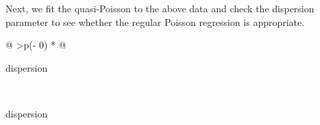 \documentclass[
]{book}
\newenvironment{Shaded}{\begin{snugshade}}{\end{snugshade}}
\newcommand{\AttributeTok}[1]{\textcolor[rgb]{0.13,0.29,0.53}{#1}}
\newcommand{\FunctionTok}[1]{\textcolor[rgb]{0.13,0.29,0.53}{\textbf{#1}}}
\newcommand{\NormalTok}[1]{#1}
\newcommand{\OtherTok}[1]{\textcolor[rgb]{0.56,0.35,0.01}{#1}}
\newcommand{\SpecialCharTok}[1]{\textcolor[rgb]{0.81,0.36,0.00}{\textbf{#1}}}
\newcommand{\StringTok}[1]{\textcolor[rgb]{0.31,0.60,0.02}{#1}}
\begin{document}
Next, we fit the quasi-Poisson to the above data and check the dispersion parameter to see whether the regular Poisson regression is appropriate.

\begin{Shaded}
\end{Shaded}

\begin{longtable}[]{@{}
  >{\centering\arraybackslash}p{(\columnwidth - 0\tabcolsep) * }@{}}
\caption{The dispersion paramter of the Poisson regression
The value of the dispersion is slightly bigger than 1 (if there is no dispersion, the dispersion parameter = 1). We only need to fit the Poisson regression to the data and use the fitted Poisson regression model to address the association between the concentration level and the survival rate.}\tabularnewline
\toprule\noalign{}
\begin{minipage}[b]{\linewidth}\centering
dispersion
\end{minipage} \\
\midrule\noalign{}
\endfirsthead
\toprule\noalign{}
\begin{minipage}[b]{\linewidth}\centering
dispersion
\end{minipage} \\
\midrule\noalign{}
\endhead
\bottomrule\noalign{}
 \\
\end{longtable}

\begin{Shaded}
\end{Shaded}
\end{document}
